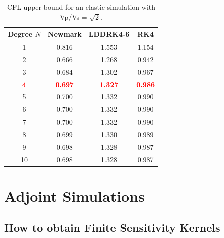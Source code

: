 \documentclass[oneside,english,onecolumn,letterpaper]{book}
\newcommand{\red}[1]{\textbf{\textcolor{Red}{#1}}}
\begin{document}
%
\clearpage
\noindent
\begin{table}[t]
\caption{CFL upper bound for an elastic simulation with Vp/Vs = $\sqrt{2}$.}
\centering
\begin{tabular}{c c c c}
\hline\hline
Degree $N$ & Newmark & LDDRK4-6 & RK4 \\ [0.5ex]
\hline
1 & 0.816 & 1.553 & 1.154 \\
2 & 0.666 & 1.268 & 0.942 \\
3 & 0.684 & 1.302 & 0.967 \\
\red{4} & \red{0.697} & \red{1.327} & \red{0.986} \\
5 & 0.700 & 1.332 & 0.990 \\
6 & 0.700 & 1.332 & 0.990 \\
7 & 0.700 & 1.332 & 0.990 \\
8 & 0.699 & 1.330 & 0.989 \\
9 & 0.698 & 1.328 & 0.987 \\
10 & 0.698 & 1.328 & 0.987 \\ [1ex]
\hline
\end{tabular}
\label{table:CFLelastic}
\end{table}



\chapter{Adjoint Simulations}



\section{How to obtain Finite Sensitivity Kernels}
\end{document}
